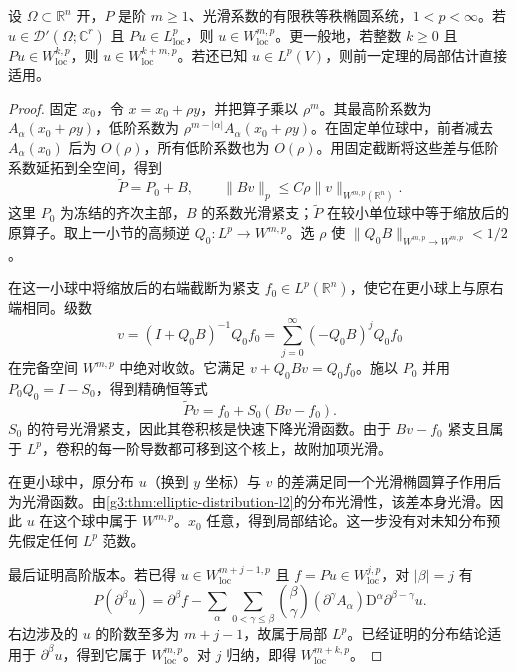 \begin{theorem}\label{g3:thm:elliptic-distribution-lp}
	设 \(\Omega\subset\mathbb R^n\) 开，\(P\) 是阶 \(m\ge1\)、光滑系数的有限秩等秩椭圆系统，\(1<p<\infty\)。若 \(u\in\mathcal D'(\Omega;\mathbb C^r)\) 且 \(Pu\in L^p_{\mathrm{loc}}\)，则 \(u\in W^{m,p}_{\mathrm{loc}}\)。更一般地，若整数 \(k\ge0\) 且 \(Pu\in W^{k,p}_{\mathrm{loc}}\)，则 \(u\in W^{k+m,p}_{\mathrm{loc}}\)。若还已知 \(u\in L^p(V)\)，则前一定理的局部估计直接适用。
\end{theorem}
\begin{proof}
	固定 \(x_0\)，令 \(x=x_0+\rho y\)，并把算子乘以 \(\rho^m\)。其最高阶系数为 \(A_\alpha(x_0+\rho y)\)，低阶系数为 \(\rho^{m-|\alpha|}A_\alpha(x_0+\rho y)\)。在固定单位球中，前者减去 \(A_\alpha(x_0)\) 后为 \(O(\rho)\)，所有低阶系数也为 \(O(\rho)\)。用固定截断将这些差与低阶系数延拓到全空间，得到
	\[
		\widetilde P=P_0+B,\qquad
		\|Bv\|_p\le C\rho\|v\|_{W^{m,p}(\mathbb R^n)}.
	\]
	这里 \(P_0\) 为冻结的齐次主部，\(B\) 的系数光滑紧支；\(\widetilde P\) 在较小单位球中等于缩放后的原算子。取上一小节的高频逆 \(Q_0:L^p\to W^{m,p}\)。选 \(\rho\) 使 \(\|Q_0B\|_{W^{m,p}\to W^{m,p}}<1/2\)。

	在这一小球中将缩放后的右端截断为紧支 \(f_0\in L^p(\mathbb R^n)\)，使它在更小球上与原右端相同。级数
	\[
		v=(I+Q_0B)^{-1}Q_0f_0
		=\sum_{j=0}^\infty(-Q_0B)^jQ_0f_0
	\]
	在完备空间 \(W^{m,p}\) 中绝对收敛。它满足 \(v+Q_0Bv=Q_0f_0\)。施以 \(P_0\) 并用 \(P_0Q_0=I-S_0\)，得到精确恒等式
	\[
		\widetilde Pv=f_0+S_0(Bv-f_0).
	\]
	\(S_0\) 的符号光滑紧支，因此其卷积核是快速下降光滑函数。由于 \(Bv-f_0\) 紧支且属于 \(L^p\)，卷积的每一阶导数都可移到这个核上，故附加项光滑。

	在更小球中，原分布 \(u\)（换到 \(y\) 坐标）与 \(v\) 的差满足同一个光滑椭圆算子作用后为光滑函数。由\cref{g3:thm:elliptic-distribution-l2}的分布光滑性，该差本身光滑。因此 \(u\) 在这个球中属于 \(W^{m,p}\)。\(x_0\) 任意，得到局部结论。这一步没有对未知分布预先假定任何 \(L^p\) 范数。

	最后证明高阶版本。若已得 \(u\in W^{m+j-1,p}_{\mathrm{loc}}\) 且 \(f=Pu\in W^{j,p}_{\mathrm{loc}}\)，对 \(|\beta|=j\) 有
	\[
		P(\partial^\beta u)=\partial^\beta f
		-\sum_{\alpha}\sum_{0<\gamma\le\beta}
		\binom\beta\gamma(\partial^\gamma A_\alpha)\mathrm D^\alpha\partial^{\beta-\gamma}u.
	\]
	右边涉及的 \(u\) 的阶数至多为 \(m+j-1\)，故属于局部 \(L^p\)。已经证明的分布结论适用于 \(\partial^\beta u\)，得到它属于 \(W^{m,p}_{\mathrm{loc}}\)。对 \(j\) 归纳，即得 \(W^{m+k,p}_{\mathrm{loc}}\)。
\end{proof}

